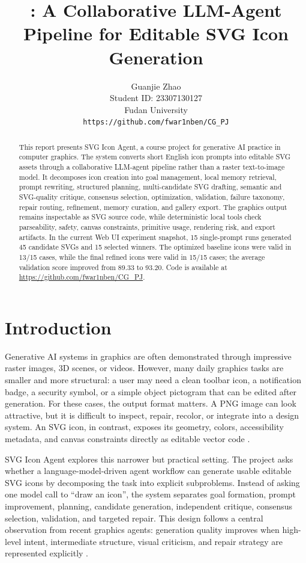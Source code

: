 \documentclass[10pt]{article}
\title{\vspace{-1.8em}\textbf{\project: A Collaborative LLM-Agent Pipeline for Editable SVG Icon Generation}}
\author{
  Guanjie Zhao\\
  Student ID: 23307130127\\
  Fudan University\\
  \texttt{https://github.com/fwar1nben/CG\_PJ}
}
\date{}
\newcommand{\project}{SVG Icon Agent}
\begin{document}
\maketitle

\begin{abstract}
This report presents \project, a course project for generative AI practice in computer graphics.
The system converts short English icon prompts into editable SVG assets through a collaborative LLM-agent pipeline rather than a raster text-to-image model.
It decomposes icon creation into goal management, local memory retrieval, prompt rewriting, structured planning, multi-candidate SVG drafting, semantic and SVG-quality critique, consensus selection, optimization, validation, failure taxonomy, repair routing, refinement, memory curation, and gallery export.
The graphics output remains inspectable as SVG source code, while deterministic local tools check parseability, safety, canvas constraints, primitive usage, rendering risk, and export artifacts.
In the current Web UI experiment snapshot, 15 single-prompt runs generated 45 candidate SVGs and 15 selected winners.
The optimized baseline icons were valid in 13/15 cases, while the final refined icons were valid in 15/15 cases; the average validation score improved from 89.33 to 93.20.
Code is available at \url{https://github.com/fwar1nben/CG_PJ}.
\end{abstract}

\section{Introduction}

Generative AI systems in graphics are often demonstrated through impressive raster images, 3D scenes, or videos.
However, many daily graphics tasks are smaller and more structural: a user may need a clean toolbar icon, a notification badge, a security symbol, or a simple object pictogram that can be edited after generation.
For these cases, the output format matters.
A PNG image can look attractive, but it is difficult to inspect, repair, recolor, or integrate into a design system.
An SVG icon, in contrast, exposes its geometry, colors, accessibility metadata, and canvas constraints directly as editable vector code \citep{svg11}.

\project{} explores this narrower but practical setting.
The project asks whether a language-model-driven agent workflow can generate usable editable SVG icons by decomposing the task into explicit subproblems.
Instead of asking one model call to ``draw an icon'', the system separates goal formation, prompt improvement, planning, candidate generation, independent critique, consensus selection, validation, and targeted repair.
This design follows a central observation from recent graphics agents: generation quality improves when high-level intent, intermediate structure, visual criticism, and repair strategy are represented explicitly \citep{genpilot2025,paper2poster2025,posterforest2025}.
\end{document}
